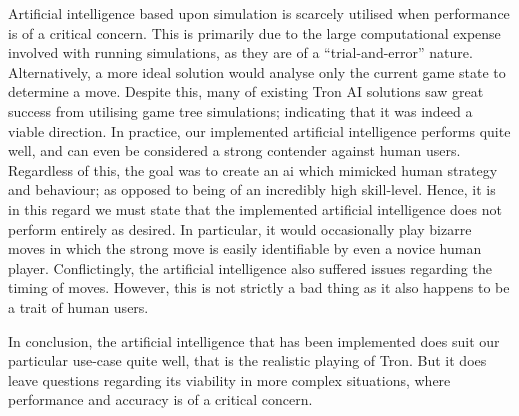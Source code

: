 \documentclass{standalone}
\begin{document}
		Artificial intelligence based upon simulation is scarcely utilised when performance is of a critical concern. This is primarily due to the large computational expense involved with running simulations, as they are of a \enquote{trial-and-error} nature. Alternatively, a more ideal solution would analyse only the current game state to determine a move. Despite this, many of existing Tron AI solutions saw great success from utilising game tree simulations; indicating that it was indeed a viable direction. In practice, our implemented artificial intelligence performs quite well, and can even be considered a strong contender against human users. Regardless of this, the goal was to create an ai which mimicked human strategy and behaviour; as opposed to being of an incredibly high skill-level. Hence, it is in this regard we must state that the implemented artificial intelligence does not perform entirely as desired. In particular, it would occasionally play bizarre moves in which the strong move is easily identifiable by even a novice human player. Conflictingly, the artificial intelligence also suffered issues regarding the timing of moves. However, this is not strictly a bad thing as it also happens to be a trait of human users.

		In conclusion, the artificial intelligence that has been implemented does suit our particular use-case quite well, that is the realistic playing of Tron. But it does leave questions regarding its viability in more complex situations, where performance and accuracy is of a critical concern.
\end{document}
